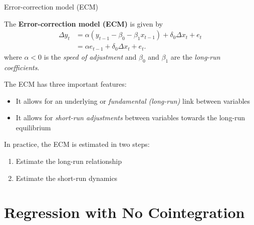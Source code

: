 \documentclass[10pt,aspectratio=169]{beamer}  %
\begin{document}

\begin{frame}{Error-correction model (ECM)}

    \bigskip
    The \textbf{Error-correction model (ECM)} is given by
    \begin{align*}
        \Delta y_{t} & = \alpha \left( y_{t-1} - \beta_0 - \beta_1 x_{t-1} \right) + \delta_0 \Delta x_{t} + e_{t} \\
        & = \alpha e_{t-1} + \delta_0 \Delta x_{t} + e_{t}.
    \end{align*}
    where $ \alpha < 0 $ is the \textit{speed of adjustment} and $ \beta_0 $ and $ \beta_1 $ are the \textit{long-run coefficients}.

    \medskip
    The ECM has three important features:
    \begin{itemize}\itemsep=0.5em
        \item It allows for an underlying or \textit{fundamental (long-run)} link between variables
        \item It allows for \textit{short-run adjustments} between variables towards the long-run equilibrium
    \end{itemize}

    In practice, the ECM is estimated in two steps:
    \begin{enumerate}
        \item Estimate the long-run relationship
        \item Estimate the short-run dynamics
    \end{enumerate}

\end{frame}


\section{Regression with No Cointegration}

\end{document}
